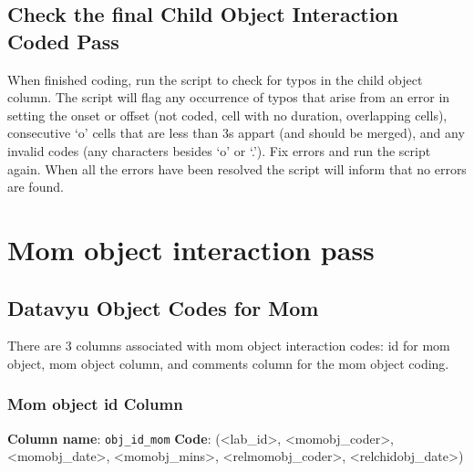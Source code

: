 \documentclass[
  12pt,
]{book}
\begin{document}
\hypertarget{check-the-final-child-object-interaction-coded-pass}{%
\subsection*{Check the final Child Object Interaction Coded Pass}\label{check-the-final-child-object-interaction-coded-pass}}

When finished coding, run the script to check for typos in the child object column. The script will flag any occurrence of typos that arise from an error in setting the onset or offset (not coded, cell with no duration, overlapping cells), consecutive `o' cells that are less than 3s appart (and should be merged), and any invalid codes (any characters besides `o' or `.'). Fix errors and run the script again. When all the errors have been resolved the script will inform that no errors are found.

\hypertarget{mom-object-interaction-pass}{%
\section{Mom object interaction pass}\label{mom-object-interaction-pass}}

\hypertarget{datavyu-object-codes-for-mom}{%
\subsection*{Datavyu Object Codes for Mom}\label{datavyu-object-codes-for-mom}}

There are 3 columns associated with mom object interaction codes: id for mom object, mom object column, and comments column for the mom object coding.

\hypertarget{mom-object-id-column}{%
\subsubsection*{Mom object id Column}\label{mom-object-id-column}}

\textbf{Column name}: \texttt{obj\_id\_mom}
\textbf{Code}: (\textless lab\_id\textgreater, \textless momobj\_coder\textgreater, \textless momobj\_date\textgreater, \textless momobj\_mins\textgreater, \textless relmomobj\_coder\textgreater, \textless relchidobj\_date\textgreater)
\end{document}
